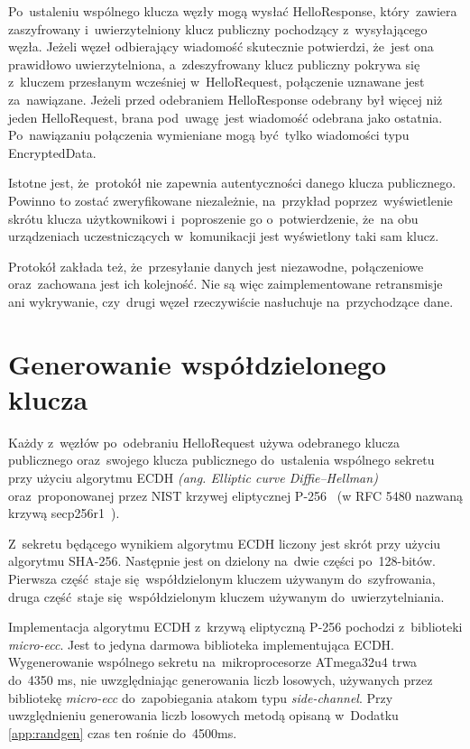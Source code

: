 Po~ustaleniu wspólnego klucza węzły mogą wysłać HelloResponse, który~zawiera zaszyfrowany i~uwierzytelniony klucz publiczny pochodzący z~wysyłającego węzła. Jeżeli węzeł odbierający wiadomość skutecznie potwierdzi, że~jest ona prawidłowo uwierzytelniona, a~zdeszyfrowany klucz publiczny pokrywa się z~kluczem przesłanym wcześniej w~HelloRequest, połączenie uznawane jest za~nawiązane. Jeżeli przed odebraniem HelloResponse odebrany był więcej niż jeden HelloRequest, brana pod~uwagę jest wiadomość odebrana jako ostatnia. Po~nawiązaniu połączenia wymieniane mogą być tylko wiadomości typu EncryptedData.

Istotne jest, że~protokół nie zapewnia autentyczności danego klucza publicznego. Powinno to zostać zweryfikowane niezależnie, na~przykład poprzez~wyświetlenie skrótu klucza użytkownikowi i~poproszenie go o~potwierdzenie, że~na obu urządzeniach uczestniczących w~komunikacji jest wyświetlony taki sam klucz.

Protokół zakłada też, że~przesyłanie danych jest niezawodne, połączeniowe oraz~zachowana jest ich kolejność. Nie są więc zaimplementowane retransmisje ani wykrywanie, czy~drugi węzeł rzeczywiście nasłuchuje na~przychodzące dane.

\section{Generowanie współdzielonego klucza}
\label{sec:sharedkey}

Każdy z~węzłów po~odebraniu HelloRequest używa odebranego klucza publicznego oraz~swojego klucza publicznego do~ustalenia wspólnego sekretu przy użyciu algorytmu ECDH \emph{(ang. Elliptic curve Diffie--Hellman)} oraz~proponowanej przez NIST krzywej eliptycznej P-256~\cite{kerry2013digital} (w RFC 5480 nazwaną krzywą secp256r1~\cite{turner2009elliptic}).

Z~sekretu będącego wynikiem algorytmu ECDH liczony jest skrót przy użyciu algorytmu SHA-256. Następnie jest on dzielony na~dwie części po~128-bitów. Pierwsza część staje się współdzielonym kluczem używanym do~szyfrowania, druga część staje się współdzielonym kluczem używanym do~uwierzytelniania.

Implementacja algorytmu ECDH z~krzywą eliptyczną P-256 pochodzi z~biblioteki \emph{micro-ecc}. Jest to jedyna darmowa biblioteka implementująca ECDH. Wygenerowanie wspólnego sekretu na~mikroprocesorze ATmega32u4 trwa do~4350 ms, nie uwzględniając generowania liczb losowych, używanych przez bibliotekę \emph{micro-ecc} do~zapobiegania atakom typu \emph{side-channel}. Przy uwzględnieniu generowania liczb losowych metodą opisaną w~Dodatku \ref{app:randgen} czas ten rośnie do~4500ms.

